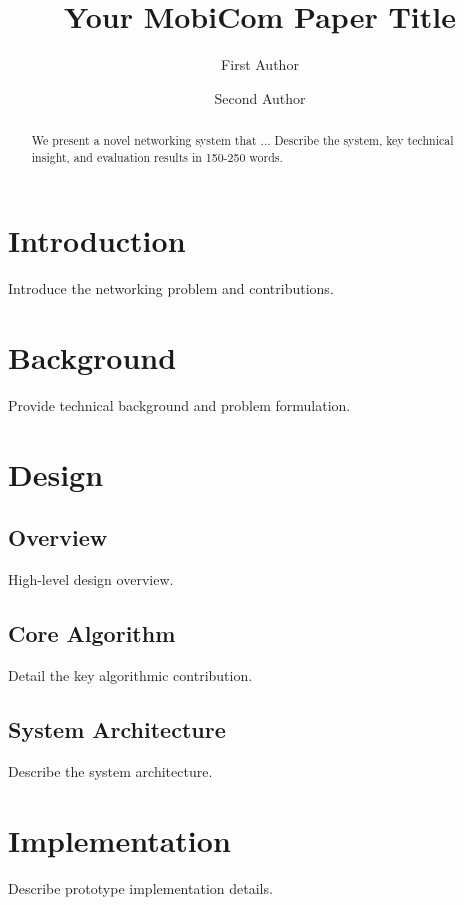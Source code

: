 \documentclass[sigconf,review]{acmart}
\begin{document}
\title{Your MobiCom Paper Title}

\author{First Author}

\author{Second Author}

\begin{abstract}
We present a novel networking system that ... Describe the system, key technical insight, and evaluation results in 150-250 words.
\end{abstract}


\maketitle

\section{Introduction}
Introduce the networking problem and contributions.

\section{Background}
Provide technical background and problem formulation.

\section{Design}
\subsection{Overview}
High-level design overview.

\subsection{Core Algorithm}
Detail the key algorithmic contribution.

\subsection{System Architecture}
Describe the system architecture.

\section{Implementation}
Describe prototype implementation details.
\end{document}
